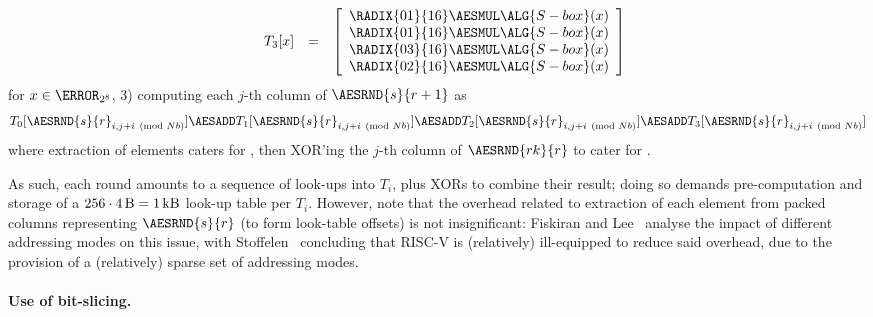 \[\begin{array}{cc}
\begin{array}{lcl}
   \end{array}
   &
   \begin{array}{lcl}
   T_3[x] &=& \left[\begin{array}{c}
                    \RADIX{01}{16} \AESMUL \ALG{S-box}( x ) \\
                    \RADIX{01}{16} \AESMUL \ALG{S-box}( x ) \\
                    \RADIX{03}{16} \AESMUL \ALG{S-box}( x ) \\
                    \RADIX{02}{16} \AESMUL \ALG{S-box}( x ) \\
                    \end{array} \right]
   \end{array}
   \end{array}
   \]
   for $x \in \F_{2^8}$,
3) computing each $j$-th column of $\AESRND{s}{r+1}$ as
   \[
   T_0[ \AESRND{s}{r}_{i, j + i \pmod{Nb}} ] \AESADD
   T_1[ \AESRND{s}{r}_{i, j + i \pmod{Nb}} ] \AESADD
   T_2[ \AESRND{s}{r}_{i, j + i \pmod{Nb}} ] \AESADD
   T_3[ \AESRND{s}{r}_{i, j + i \pmod{Nb}} ]
   \]
   where extraction of elements caters for , then XOR'ing 
   the $j$-th column of $\AESRND{rk}{r}$ to cater for .

As such, each round amounts to a sequence of look-ups into $T_i$, plus XORs 
to combine their result; 
doing so demands pre-computation and storage of a
$
256 \cdot \SI{4}{\byte} = \SI{1}{\kilo\byte}
$
look-up table per $T_i$.
However, note that the overhead related to extraction of each element from 
packed columns representing $\AESRND{s}{r}$ 
(to form look-table offsets) 
is not insignificant:
Fiskiran and Lee~\cite{FisLee:01}
analyse the impact of different addressing modes on this issue, with
Stoffelen~\cite[Section 3.1]{Stoffelen:19}
concluding that RISC-V is (relatively) ill-equipped to reduce said overhead,
due to the provision of a (relatively) sparse set of addressing modes.


\paragraph{Use of bit-slicing.}


\cite{MatNak:07,Konighofer:08,KasSch:09}

\cite{Stoffelen:19}

